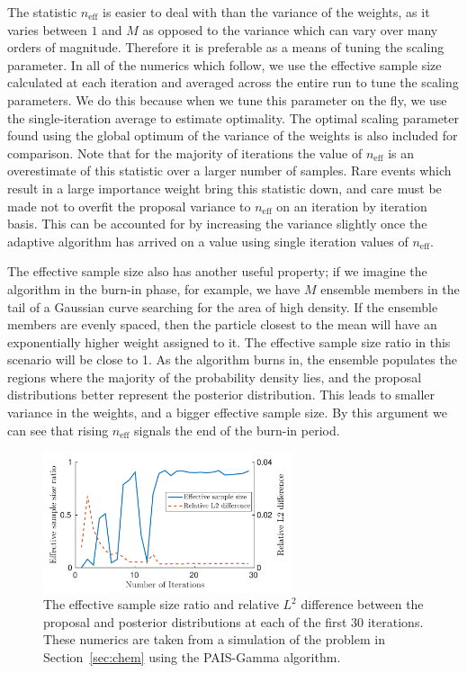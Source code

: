 \documentclass[final]{siamltex}
\newcommand{\neff}{n_{\text{eff}}}
\begin{document}
The statistic $\neff$ is easier to deal with than the variance of the
weights, as it varies between $1$ and $M$ as opposed to the variance
which can vary over many orders of magnitude.
Therefore it is preferable as a means of tuning the scaling
parameter. In all of the numerics which follow, we use the effective sample size
calculated at each iteration and averaged across the entire run to
tune the scaling parameters. We do this because when we tune this
parameter on the fly, we use the single-iteration average to estimate
optimality. The optimal scaling parameter found using the global
optimum of the variance of the weights is also included for
comparison. Note that for the majority of iterations the value of
$\neff$ is an overestimate of this statistic over a larger number of
samples. Rare events which result in a large importance weight bring
this statistic down, and care must be made not to overfit the proposal
variance to $\neff$ on an iteration by iteration basis. This can be
accounted for by increasing the variance slightly once the adaptive
algorithm has arrived on a value using single iteration values of $\neff$.

The effective sample size also has another useful property; if we
imagine the algorithm in the burn-in phase, for example, we have $M$
ensemble members in the tail of a Gaussian curve searching for the area of
high density. If the ensemble members are evenly spaced, then the particle
closest to the mean will have an exponentially higher weight assigned
to it. The effective sample size ratio in this scenario will be close to
1. As the algorithm burns in, the ensemble populates the regions where
the majority of the probability density lies, and the proposal
distributions better represent the posterior distribution. This leads
to smaller variance in the weights, and a bigger effective sample size.
By this argument we can see that rising $\neff$ signals the end of the burn-in period.

\begin{figure}[htb]
\centering
\includegraphics[width=0.65\textwidth]{"figures/C1_burnin"}
\caption{The effective sample size ratio and relative $L^2$ difference
between the proposal and posterior distributions at each of the first 30
iterations. These numerics are taken from a simulation of the problem in
Section~\ref{sec:chem} using the PAIS-Gamma algorithm.}
\label{fig:neff-burnin}
\end{figure}
\end{document}
